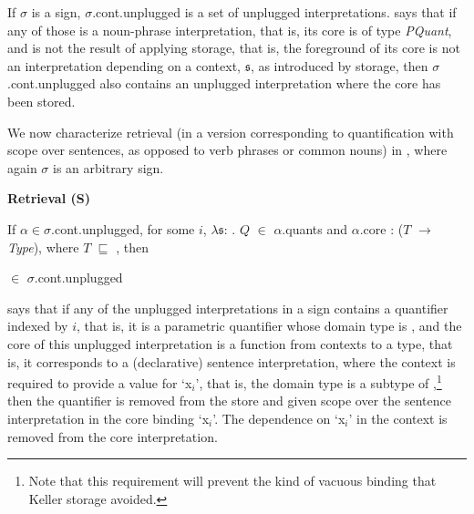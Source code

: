 If $\sigma$ is a sign, $\sigma$.cont.unplugged is a set of unplugged interpretations.
\preveg{} says that if any
of those is a noun-phrase interpretation, that is, its core is of type
\textit{PQuant}, and is not the result of applying storage, that is,
the foreground of its core is not an interpretation depending on a
context, $\mathfrak{s}$, as introduced by storage, then
$\sigma$.cont.unplugged also contains an unplugged interpretation
where the core has been stored. 

We now characterize retrieval (in a version corresponding to
quantification with scope over sentences, as opposed to verb phrases
or common nouns) in \nexteg{}, where again $\sigma$ is an arbitrary
sign.
\begin{ex} 
\textbf{Retrieval (S)} 

If $\alpha\in\sigma$.cont.unplugged, for some $i$,
$\lambda\mathfrak{s}$:
. $Q$ $\in$ $\alpha$.quants and $\alpha$.core : ($T$ $\rightarrow$
\textit{Type}), where $T$ $\sqsubseteq$
, then \\

\hspace*{1em}

\hspace*{4em}$\in$ $\sigma$.cont.unplugged
\end{ex} 
\preveg{} says that if any of the unplugged interpretations in a sign
contains a quantifier indexed by $i$, that is, it is a parametric
quantifier whose domain type is
, and the core of this
unplugged interpretation is a function from contexts to a type, that
is, it corresponds to a (declarative) sentence interpretation, where
the context is required to provide a value for `x$_i$', that is, the
domain type is a subtype of
,\footnote{Note that
  this requirement will prevent the kind of vacuous binding that
  Keller storage \citep{Keller1988} avoided.} then the quantifier is
removed from the store and given scope over the sentence
interpretation in the core binding `x$_i$'.  The dependence on `x$_i$'
in the context is removed from the core interpretation. 

